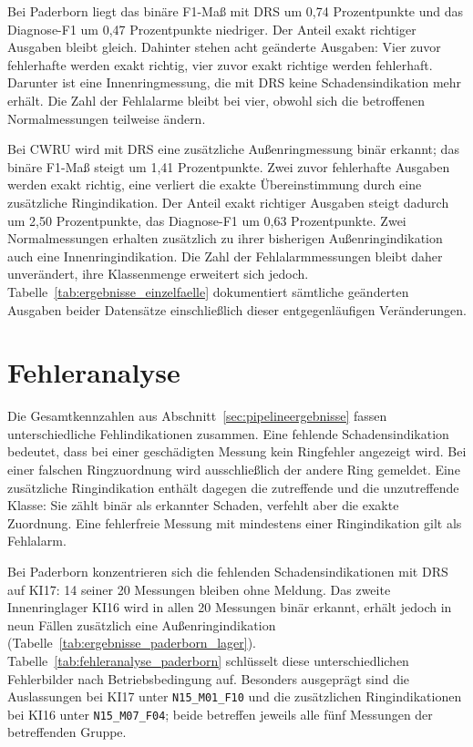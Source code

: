 Bei Paderborn liegt das binäre F1-Maß mit DRS um 0,74 Prozentpunkte und das
Diagnose-F1 um 0,47 Prozentpunkte niedriger. Der Anteil exakt richtiger
Ausgaben bleibt gleich. Dahinter stehen acht geänderte Ausgaben: Vier
zuvor fehlerhafte werden exakt richtig, vier zuvor exakt richtige werden
fehlerhaft. Darunter ist eine Innenringmessung, die mit DRS keine
Schadensindikation mehr erhält. Die Zahl der Fehlalarme bleibt bei vier,
obwohl sich die betroffenen Normalmessungen teilweise ändern.

Bei CWRU wird mit DRS eine zusätzliche Außenringmessung binär erkannt;
das binäre F1-Maß steigt um 1,41 Prozentpunkte. Zwei zuvor fehlerhafte
Ausgaben werden exakt richtig, eine verliert die exakte Übereinstimmung
durch eine zusätzliche Ringindikation. Der Anteil exakt richtiger Ausgaben
steigt dadurch um 2,50 Prozentpunkte, das Diagnose-F1 um 0,63 Prozentpunkte.
Zwei Normalmessungen erhalten zusätzlich zu ihrer bisherigen
Außenringindikation auch eine Innenringindikation. Die Zahl der
Fehlalarmmessungen bleibt daher unverändert, ihre Klassenmenge erweitert
sich jedoch. Tabelle~\ref{tab:ergebnisse_einzelfaelle} dokumentiert sämtliche
geänderten Ausgaben beider Datensätze einschließlich dieser
entgegenläufigen Veränderungen.

\section{Fehleranalyse}
\label{sec:fehleranalyse}

\begingroup
\raggedbottom
{}
Die Gesamtkennzahlen aus Abschnitt~\ref{sec:pipelineergebnisse} fassen
unterschiedliche Fehlindikationen zusammen. Eine fehlende Schadensindikation
bedeutet, dass bei einer geschädigten Messung kein Ringfehler angezeigt wird.
Bei einer falschen Ringzuordnung wird ausschließlich der andere Ring
gemeldet. Eine zusätzliche Ringindikation enthält dagegen die zutreffende
und die unzutreffende Klasse: Sie zählt binär als erkannter Schaden,
verfehlt aber die exakte Zuordnung. Eine fehlerfreie Messung mit mindestens
einer Ringindikation gilt als Fehlalarm.


Bei Paderborn konzentrieren sich die fehlenden Schadensindikationen mit DRS
auf KI17: 14 seiner 20 Messungen bleiben ohne Meldung. Das zweite
Innenringlager KI16 wird in allen 20 Messungen binär erkannt, erhält jedoch
in neun Fällen zusätzlich eine Außenringindikation
(Tabelle~\ref{tab:ergebnisse_paderborn_lager}).
Tabelle~\ref{tab:fehleranalyse_paderborn} schlüsselt diese unterschiedlichen
Fehlerbilder nach Betriebsbedingung auf. Besonders ausgeprägt sind die
Auslassungen bei KI17 unter \texttt{N15\_M01\_F10} und die zusätzlichen
Ringindikationen bei KI16 unter \texttt{N15\_M07\_F04}; beide betreffen
jeweils alle fünf Messungen der betreffenden Gruppe.

